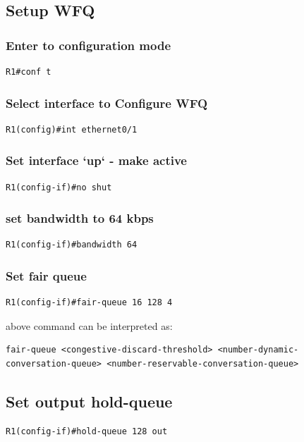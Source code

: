 \documentclass[paper=letter, fontsize=12pt]{article}
\begin{document}
\subsection{Setup WFQ}

\subsubsection{Enter to configuration mode}
\begin{verbatim}
R1#conf t
\end{verbatim}

\subsubsection{Select interface to Configure WFQ}
\begin{verbatim}
R1(config)#int ethernet0/1
\end{verbatim}

\subsubsection{Set interface `up` - make active}
\begin{verbatim}
R1(config-if)#no shut
\end{verbatim}

\subsubsection{set bandwidth to 64 kbps}
\begin{verbatim}
R1(config-if)#bandwidth 64
\end{verbatim}

\subsubsection{Set fair queue}
\begin{verbatim}
R1(config-if)#fair-queue 16 128 4
\end{verbatim}
above command can be interpreted as:
\begin{verbatim}
fair-queue <congestive-discard-threshold> <number-dynamic-conversation-queue> <number-reservable-conversation-queue>
\end{verbatim}

\subsection{Set output hold-queue}
\begin{verbatim}
R1(config-if)#hold-queue 128 out
\end{verbatim}
\end{document}
